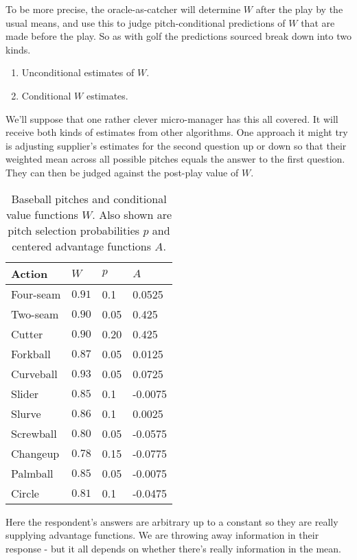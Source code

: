 To be more precise, the oracle-as-catcher will determine $W$ after the play by the usual means, and use this to judge pitch-conditional predictions of $W$ that are made before the play. So as with golf the predictions sourced break down into two kinds. 

\begin{enumerate}
    \item Unconditional estimates of $W$. 
    \item Conditional $W$ estimates. 
\end{enumerate}

We'll suppose that one rather clever micro-manager has this all covered. It will receive both kinds of estimates from other algorithms. One approach it might try is adjusting supplier's estimates for the second question up or down so that their weighted mean across all possible pitches equals the answer to the first question. They can then be judged against the post-play value of $W$. 

\begin{table}
\begin{center}
    
\begin{tabular}{|l|l|l|l|}
  \hline
  Action & $W$ & $p$ & $A$ \\
  \hline
  Four-seam &  $0.91$ & 0.1 & 0.0525\\
  Two-seam & $0.90$  & 0.05 & 0.425\\
  Cutter & $0.90$  & 0.20 & 0.425\\
  Forkball & $0.87$  & 0.05 & 0.0125\\
  Curveball & $0.93$ & 0.05 & 0.0725 \\
  Slider & $0.85$  & 0.1 & -0.0075 \\
  Slurve & $0.86$  & 0.1 & 0.0025 \\
  Screwball & $0.80$  & 0.05 & -0.0575\\
  Changeup & $0.78$ & 0.15 &-0.0775\\
  Palmball & $0.85$  & 0.05 &  -0.0075\\
  Circle  & $0.81$  & 0.1 & -0.0475\\
  \hline
\end{tabular}
\caption{Baseball pitches and conditional value functions $W$. Also shown are pitch selection probabilities $p$ and centered
advantage functions $A$.}
\label{tab:pitch}
\end{center}
\end{table}

Here the respondent's answers are arbitrary up to a constant so they are really supplying advantage functions. We are throwing away information in their response - but it all depends on whether there's really information in the mean. 

